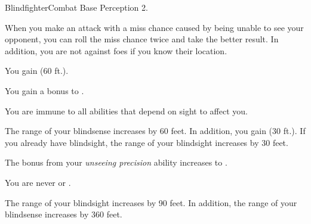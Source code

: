     \begin{feat}{Blindfighter}{Combat}
        \featpre Base Perception 2.

         When you make an attack with a miss chance caused by being unable to see your opponent, you can roll the miss chance twice and take the better result.
        In addition, you are not \partiallyunaware against foes if you know their location.

         You gain  (60 ft.).

         You gain a  bonus to .

         You are immune to all abilities that depend on sight to affect you.

         The range of your blindsense increases by 60 feet.
        In addition, you gain  (30 ft.).
        If you already have blindsight, the range of your blindsight increases by 30 feet.

         The bonus from your \textit{unseeing precision} ability increases to .

         You are never \unaware or \partiallyunaware.

         The range of your blindsight increases by 90 feet.
        In addition, the range of your blindsense increases by 360 feet.
    \end{feat}

